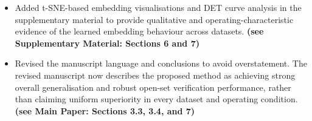 \documentclass[11pt]{article}
\theoremstyle{remark}
\begin{document}
\begin{itemize}
    \item Added t-SNE-based embedding visualisations and DET curve analysis in the supplementary material to provide qualitative and operating-characteristic evidence of the learned embedding behaviour across datasets. \textbf{(see Supplementary Material: Sections 6 and 7)}
    
    \item Revised the manuscript language and conclusions to avoid overstatement. The revised manuscript now describes the proposed method as achieving strong overall generalisation and robust open-set verification performance, rather than claiming uniform superiority in every dataset and operating condition. \textbf{(see Main Paper: Sections 3.3, 3.4, and 7)}
\end{itemize}


\color{blue} 
\end{document}
